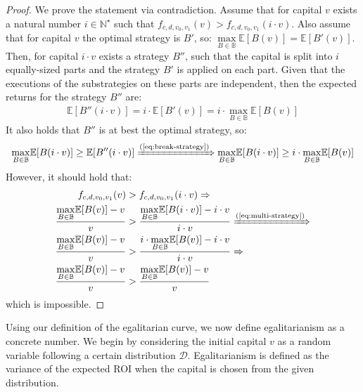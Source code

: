 \begin{proof}
    We prove the statement via contradiction. Assume that for capital $v$
    exists a natural number $i \in \mathbb{N}^\star$ such that
    $f_{c,d,v_0,v_1}(v) > f_{c,d,v_0,v_1}(i \cdot v)$. Also assume that for
    capital $v$ the optimal strategy is $B'$, so: $\underset{B \in
    \mathbb{B}}{\max}{\mathbb{E}[B(v)]} = \mathbb{E}[B'(v)]$. Then, for capital
    $i \cdot v$ exists a strategy $B''$, such that the capital is split into $i$
    equally-sized parts and the strategy $B'$ is applied on each part. Given
    that the executions of the substrategies on these parts are independent,
    then the expected returns for the strategy $B''$ are:
    \begin{align}\label{eq:break-strategy}
        \mathbb{E}[B''(i \cdot v)] = i \cdot \mathbb{E}[B'(v)]  = i \cdot \underset{B \in \mathbb{B}}{\max}{\mathbb{E}[B(v)]}
    \end{align}
    It also holds that $B''$ is at best the optimal strategy, so:
    \begin{align}\label{eq:multi-strategy}
        \underset{B \in \mathbb{B}}{\max}{\mathbb{E}[B(i \cdot v)]} \geq \mathbb{E}[B''(i \cdot v)] \xRightarrow{\text{(\ref{eq:break-strategy})}}
        \underset{B \in \mathbb{B}}{\max}{\mathbb{E}[B(i \cdot v)]} \geq i \cdot \underset{B \in \mathbb{B}}{\max}{\mathbb{E}[B(v)]}
    \end{align}
    However, it should hold that:
    \begin{alignat}{2}
        f_{c,d,v_0,v_1}(v) &> f_{c,d,v_0,v_1}(i \cdot v) \Rightarrow \notag\\
        \frac{\underset{B \in \mathbb{B}}{\max}{\mathbb{E}[B(v)]} - v}{v} &> \frac{\underset{B \in \mathbb{B}}{\max}{\mathbb{E}[B(i \cdot v)]} - i \cdot v}{i \cdot v} \xRightarrow{\text{(\ref{eq:multi-strategy})}} \notag\\
        \frac{\underset{B \in \mathbb{B}}{\max}{\mathbb{E}[B(v)]} - v}{v} &> \frac{i \cdot \underset{B \in \mathbb{B}}{\max}{\mathbb{E}[B(v)]} - i \cdot v}{i \cdot v} \Rightarrow \notag\\
        \frac{\underset{B \in \mathbb{B}}{\max}{\mathbb{E}[B(v)]} - v}{v} &> \frac{\underset{B \in \mathbb{B}}{\max}{\mathbb{E}[B(v)]} - v}{v}
    \end{alignat}
    which is impossible.
\end{proof}

Using our definition of the egalitarian curve, we now define egalitarianism as
a concrete number. We begin by considering the initial capital $v$ as a random
variable following a certain distribution $\mathcal{D}$. Egalitarianism is
defined as the variance of the expected ROI when the capital is chosen from the
given distribution.

